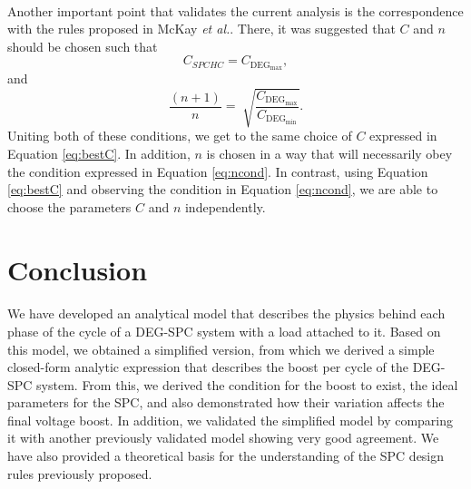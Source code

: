 \paragraph{} Another important point that validates the current analysis is the correspondence with the rules proposed in McKay \textit{et al.}\cite{SPCdesign}. There, it was suggested that $C$ and $n$ should be chosen such that
\begin{equation}
C_{SPC{HC}} = C_{\text{DEG}_\text{max}},
\end{equation}
and
\begin{equation}
\frac{(n+1)}{n} = \sqrt[]{\frac{C_{\text{DEG}_\text{max}}}{C_{\text{DEG}_\text{min}}}}.
\end{equation}
Uniting both of these conditions, we get to the same choice of $C$  expressed in Equation \ref{eq:bestC}. In addition, $n$ is chosen in a way that will necessarily obey the condition expressed in Equation \ref{eq:ncond}. In contrast, using Equation  \ref{eq:bestC} and observing the condition in Equation \ref{eq:ncond},  we are able to choose the parameters $C$ and $n$ independently.


\section{Conclusion}
\paragraph{} We have developed an analytical model that describes the physics behind each phase of the cycle of a DEG-SPC system with a load attached to it. Based on this model, we obtained a simplified version, from which we derived a simple closed-form analytic expression that describes the boost  per cycle of the DEG-SPC system. From this, we derived the condition for the boost to exist, the ideal parameters for the SPC, and also demonstrated how their variation affects the final voltage boost. In addition, we validated the simplified model by comparing it with another previously validated model\cite{Thesis} showing very good agreement. We have also provided a theoretical basis for the understanding of the SPC design rules previously proposed\cite{SPCdesign}. 


